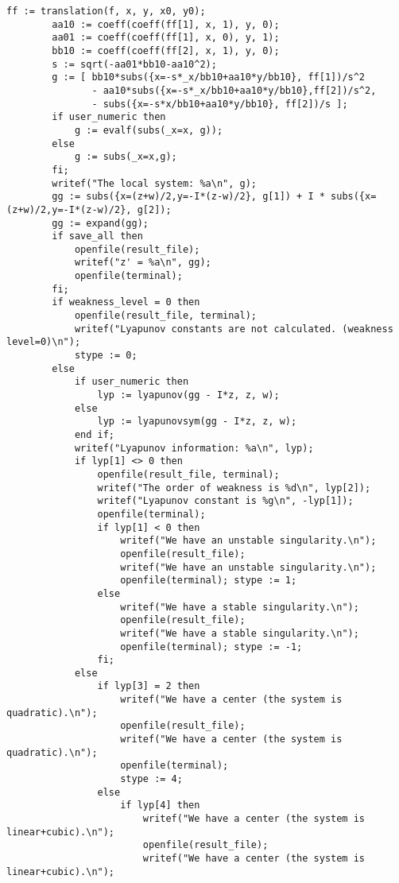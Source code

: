 \documentclass[a4paper,10pt]{article}
\begin{document}
\begin{lstlisting}[name=weakfocus]
        ff := translation(f, x, y, x0, y0);
        aa10 := coeff(coeff(ff[1], x, 1), y, 0);
        aa01 := coeff(coeff(ff[1], x, 0), y, 1);
        bb10 := coeff(coeff(ff[2], x, 1), y, 0);
        s := sqrt(-aa01*bb10-aa10^2);
        g := [ bb10*subs({x=-s*_x/bb10+aa10*y/bb10}, ff[1])/s^2
               - aa10*subs({x=-s*_x/bb10+aa10*y/bb10},ff[2])/s^2,
               - subs({x=-s*x/bb10+aa10*y/bb10}, ff[2])/s ];
        if user_numeric then
            g := evalf(subs(_x=x, g));
        else
            g := subs(_x=x,g);
        fi;
        writef("The local system: %a\n", g);
        gg := subs({x=(z+w)/2,y=-I*(z-w)/2}, g[1]) + I * subs({x=(z+w)/2,y=-I*(z-w)/2}, g[2]);
        gg := expand(gg);
        if save_all then
            openfile(result_file);
            writef("z' = %a\n", gg);
            openfile(terminal);
        fi;
        if weakness_level = 0 then
            openfile(result_file, terminal);
            writef("Lyapunov constants are not calculated. (weakness level=0)\n");
            stype := 0;
        else
            if user_numeric then
                lyp := lyapunov(gg - I*z, z, w);
            else
                lyp := lyapunovsym(gg - I*z, z, w);
            end if;
            writef("Lyapunov information: %a\n", lyp);
            if lyp[1] <> 0 then
                openfile(result_file, terminal);
                writef("The order of weakness is %d\n", lyp[2]);
                writef("Lyapunov constant is %g\n", -lyp[1]);
                openfile(terminal);
                if lyp[1] < 0 then
                    writef("We have an unstable singularity.\n");
                    openfile(result_file);
                    writef("We have an unstable singularity.\n");
                    openfile(terminal); stype := 1;
                else
                    writef("We have a stable singularity.\n");
                    openfile(result_file);
                    writef("We have a stable singularity.\n");
                    openfile(terminal); stype := -1;
                fi;
            else
                if lyp[3] = 2 then
                    writef("We have a center (the system is quadratic).\n");
                    openfile(result_file);
                    writef("We have a center (the system is quadratic).\n");
                    openfile(terminal);
                    stype := 4;
                else
                    if lyp[4] then
                        writef("We have a center (the system is linear+cubic).\n");
                        openfile(result_file);
                        writef("We have a center (the system is linear+cubic).\n");

\end{lstlisting}
\end{document}
